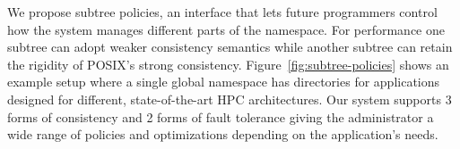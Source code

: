 We propose subtree policies, an interface that lets future programmers control
how the system manages different parts of the namespace.  For performance one
subtree can adopt weaker consistency semantics while another subtree can retain
the rigidity of POSIX's strong consistency. Figure~\ref{fig:subtree-policies}
shows an example setup where a single global namespace has directories for
applications designed for different, state-of-the-art HPC architectures.  Our
system supports 3 forms of consistency and 2 forms of fault tolerance giving
the administrator a wide range of policies and optimizations depending on the
application's needs.


